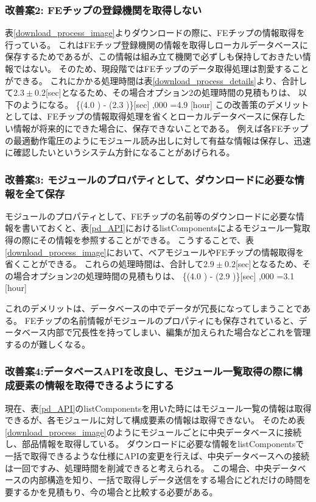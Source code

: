 \subsubsection{改善案2: FEチップの登録機関を取得しない}
表\ref{download_process_image}よりダウンロードの際に、FEチップの情報取得を行っている。
これはFEチップ登録機関の情報を取得しローカルデータベースに保存するためであるが、この情報は組み立て機関で必ずしも保持しておきたい情報ではない。
そのため、現段階ではFEチップのデータ取得処理は割愛することができる。
これにかかる処理時間は表\ref{download_process_details}より、合計して$2.3\pm0.2$[sec]となるため、その場合オプション2の処理時間の見積もりは、
以下のようになる。
\bbb
\{(4.0 ) - (2.3 )\}[\rm{sec}] ,000 =4.9  [{\rm hour}]
\eee
この改善策のデメリットとしては、FEチップの情報取得処理を省くとローカルデータベースに保存したい情報が将来的にできた場合に、保存できないことである。
例えば各FEチップの最適動作電圧のようにモジュール読み出しに対して有益な情報は保存し、迅速に確認したいというシステム方針になることがあげられる。

\subsubsection{改善案3: モジュールのプロパティとして、ダウンロードに必要な情報を全て保存}
モジュールのプロパティとして、FEチップの名前等のダウンロードに必要な情報を書いておくと、表\ref{pd_API}におけるlistComponentsによるモジュール一覧取得の際にその情報を参照することができる。
こうすることで、表\ref{download_process_image}において、ベアモジュールやFEチップの情報取得を省くことができる。
これらの処理時間は、合計して$2.9\pm0.2$[sec]となるため、その場合オプション2の処理時間の見積もりは、
\bbb
\{(4.0 ) - (2.9 )\}[\rm{sec}] ,000 =3.1  [{\rm hour}] 
\eee

これのデメリットは、データベースの中でデータが冗長になってしまうことである。
FEチップの名前情報がモジュールのプロパティにも保存されていると、データベース内部で冗長性を持ってしまい、編集が加えられた場合などこれを管理するのが難しくなる。

\subsubsection{改善案4:データベースAPIを改良し、モジュール一覧取得の際に構成要素の情報を取得できるようにする}
現在、表\ref{pd_API}のlistComponentsを用いた時にはモジュール一覧の情報は取得できるが、各モジュールに対して構成要素の情報は取得できない。
そのため表\ref{download_process_image}のようにモジュールごとに中央データベースに接続し、部品情報を取得している。
ダウンロードに必要な情報をlistComponentsで一括で取得できるような仕様にAPIの変更を行えば、中央データベースへの接続は一回ですみ、処理時間を削減できると考えられる。
この場合、中央データベースの内部構造を知り、一括で取得しデータ送信をする場合にどれだけの時間を要するかを見積もり、今の場合と比較する必要がある。\\


